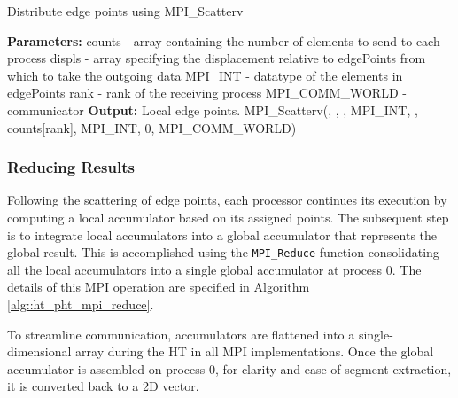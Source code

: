 \documentclass[conference]{IEEEtran}
\begin{document}
            \begin{algorithm}
                \caption{Distribute edge points using MPI\_Scatterv}
                \label{alg::ht_pht_mpi_scatterv}
                \begin{algorithmic}[1]
                    \State \textbf{Parameters:}
                    \State \hspace{\algorithmicindent} counts - array containing the number of elements to send to each process
                    \State \hspace{\algorithmicindent} displs - array specifying the displacement relative to edgePoints from which to take the outgoing data
                    \State \hspace{\algorithmicindent} MPI\_INT - datatype of the elements in edgePoints
                    \State \hspace{\algorithmicindent} rank - rank of the receiving process
                    \State \hspace{\algorithmicindent} MPI\_COMM\_WORLD - communicator
                    \State \textbf{Output:} Local edge points.
                        \State MPI\_Scatterv(, 
                        , , 
                        MPI\_INT, , 
                        counts[rank], MPI\_INT, 0, MPI\_COMM\_WORLD)
                    \EndProcedure
                \end{algorithmic}
            \end{algorithm}


        \subsubsection{Reducing Results}
        \label{subsubsec:reducing_results}

            Following the scattering of edge points, each processor continues its execution by computing a local accumulator based on its assigned points. The subsequent step is to integrate local accumulators into a global accumulator that represents the global result. This is accomplished using the \texttt{MPI\_Reduce} function consolidating all the local accumulators into a single global accumulator at process 0. The details of this MPI operation are specified in Algorithm \ref{alg::ht_pht_mpi_reduce}. 
        
            To streamline communication, accumulators are flattened into a single-dimensional array during the HT in all MPI implementations. Once the global accumulator is assembled on process 0, for clarity and ease of segment extraction, it is converted back to a 2D vector.
            
\end{document}
